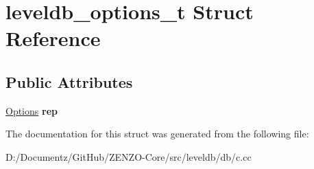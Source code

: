\hypertarget{structleveldb__options__t}{}\section{leveldb\+\_\+options\+\_\+t Struct Reference}
\label{structleveldb__options__t}
\subsection*{Public Attributes}
\begin{DoxyCompactItemize}
\item 
\mbox{\label{structleveldb__options__t_a4f9a6dde987957ab489bf26c9d191df9}} 
\mbox{\hyperlink{structleveldb_1_1_options}{Options}} {\bfseries rep}
\end{DoxyCompactItemize}


The documentation for this struct was generated from the following file\+:\begin{DoxyCompactItemize}
\item 
D\+:/\+Documentz/\+Git\+Hub/\+Z\+E\+N\+Z\+O-\/\+Core/src/leveldb/db/c.\+cc\end{DoxyCompactItemize}
